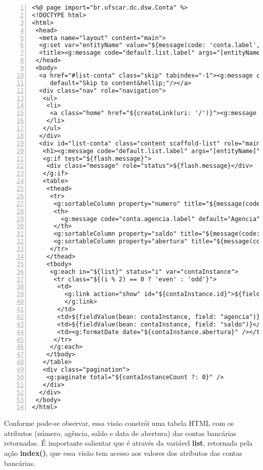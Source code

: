 \begin{lstlisting}[numbers=left,     caption=Visão     {\bf    conta/index.gsp},
    frame=trBL,float=htbp, label=codContaIndex] 
<%@ page import="br.ufscar.dc.dsw.Conta" %>
<!DOCTYPE html>
<html>
 <head>
  <meta name="layout" content="main">
  <g:set var="entityName" value="${message(code: 'conta.label', default: 'Conta')}" />
  <title><g:message code="default.list.label" args="[entityName]" /></title>
 </head>
 <body>
  <a href="#list-conta" class="skip" tabindex="-1"><g:message code="default.link.skip.label" 
     default="Skip to content&hellip;"/></a>
  <div class="nav" role="navigation">
   <ul>
    <li>
     <a class="home" href="${createLink(uri: '/')}"><g:message code="default.home.label"/></a>
    </li>
   </ul>
  </div>
  <div id="list-conta" class="content scaffold-list" role="main">
   <h1><g:message code="default.list.label" args="[entityName]" /></h1>
   <g:if test="${flash.message}">
    <div class="message" role="status">${flash.message}</div>
   </g:if>
   <table>
    <thead>
     <tr>
      <g:sortableColumn property="numero" title="${message(code: 'conta.numero.label', default: 'Numero')}" />
      <th>
        <g:message code="conta.agencia.label" default="Agencia" />
      </th>
      <g:sortableColumn property="saldo" title="${message(code: 'conta.saldo.label', default: 'Saldo')}" />
      <g:sortableColumn property="abertura" title="${message(code:'conta.abertura.label',default:'Abertura')}" />
     </tr>
    </thead>
    <tbody>
     <g:each in="${list}" status="i" var="contaInstance">
      <tr class="${(i % 2) == 0 ? 'even' : 'odd'}">
       <td>
         <g:link action="show" id="${contaInstance.id}">${fieldValue(bean: contaInstance, field: "numero")}
         </g:link>
       </td>
       <td>${fieldValue(bean: contaInstance, field: "agencia")}</td>
       <td>${fieldValue(bean: contaInstance, field: "saldo")}</td>
       <td><g:formatDate date="${contaInstance.abertura}" /></td>
      </tr>
     </g:each>
    </tbody>
   </table>
   <div class="pagination">
    <g:paginate total="${contaInstanceCount ?: 0}" />
   </div>
  </div>
 </body>
</html>
\end{lstlisting}

\vspace{0.3cm}

\noindent Conforme pode-se observar, essa  visão constrói uma tabela HTML com os
atributos  (número, agência,  saldo e  data  de abertura)  das contas  bancárias
retornadas.   É importante  salientar  que  é através  da  variável {\bf  list},
retornada pela  ação {\bf index()},  que essa visão  tem acesso aos  valores dos
atributos das contas bancárias.  

